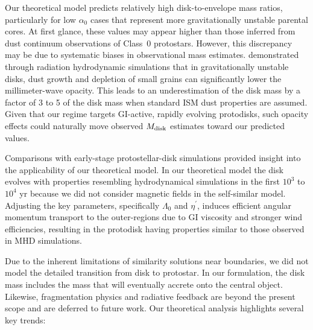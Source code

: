 \documentclass[twocolumn,linenumbers]{aastex631}
\begin{document}
Our theoretical model predicts relatively high disk-to-envelope mass ratios, particularly for low $\alpha_0$ cases that represent more gravitationally unstable parental cores. At first glance, these values may appear higher than those inferred from dust continuum observations of Class~0 protostars. However, this discrepancy may be due to systematic biases in observational mass estimates. \citet{tsukamoto2017impact} demonstrated through radiation hydrodynamic simulations that in gravitationally unstable disks, dust growth and depletion of small grains can significantly lower the millimeter-wave opacity. This leads to an underestimation of the disk mass by a factor of 3 to 5 of the disk mass when standard ISM dust properties are assumed. Given that our regime targets GI-active, rapidly evolving protodisks, such opacity effects could naturally move observed $M_{\rm disk}$ estimates toward our predicted values.

Comparisons with early-stage protostellar-disk simulations provided insight into the applicability of our theoretical model. In our theoretical model the disk evolves with properties resembling hydrodynamical simulations in the first $10^3 $ to $10^4$ yr because we did not consider magnetic fields in the self-similar model. Adjusting the key parameters, specifically $\Lambda_0$ and $\eta^{\prime}$, induces efficient angular momentum transport to the outer-regions due to GI viscosity and stronger wind efficiencies, resulting in the protodisk having properties similar to those observed in MHD simulations.

Due to the inherent limitations of similarity solutions near boundaries, we did not model the detailed transition from disk to protostar. In our formulation, the disk mass includes the mass that will eventually accrete onto the central object. Likewise, fragmentation physics and radiative feedback are beyond the present scope and are deferred to future work.
Our theoretical analysis highlights several key trends:
\end{document}
